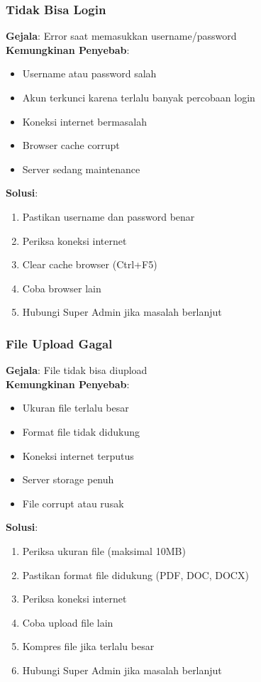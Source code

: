 \documentclass[12pt,a4paper]{article}
\begin{document}
\subsubsection{Tidak Bisa Login}
\textbf{Gejala}: Error saat memasukkan username/password\\
\textbf{Kemungkinan Penyebab}:
\begin{itemize}
\item Username atau password salah
\item Akun terkunci karena terlalu banyak percobaan login
\item Koneksi internet bermasalah
\item Browser cache corrupt
\item Server sedang maintenance
\end{itemize}
\textbf{Solusi}:
\begin{enumerate}
\item Pastikan username dan password benar
\item Periksa koneksi internet
\item Clear cache browser (Ctrl+F5)
\item Coba browser lain
\item Hubungi Super Admin jika masalah berlanjut
\end{enumerate}

\subsubsection{File Upload Gagal}
\textbf{Gejala}: File tidak bisa diupload\\
\textbf{Kemungkinan Penyebab}:
\begin{itemize}
\item Ukuran file terlalu besar
\item Format file tidak didukung
\item Koneksi internet terputus
\item Server storage penuh
\item File corrupt atau rusak
\end{itemize}
\textbf{Solusi}:
\begin{enumerate}
\item Periksa ukuran file (maksimal 10MB)
\item Pastikan format file didukung (PDF, DOC, DOCX)
\item Periksa koneksi internet
\item Coba upload file lain
\item Kompres file jika terlalu besar
\item Hubungi Super Admin jika masalah berlanjut
\end{enumerate}
\end{document}
